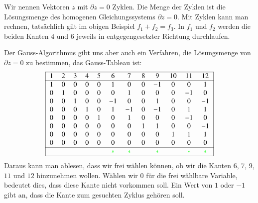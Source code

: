 Wir nennen Vektoren $z$ mit $\partial z=0$ Zyklen.
Die Menge der Zyklen ist die Lösungsmenge des homogenen
Gleichungssystems $\partial z=0$. Mit Zyklen kann man rechnen,
tatsächlich gilt im obigen Beispiel $f_1+f_2=f_3$. In $f_1$
und $f_2$ werden die beiden Kanten $4$ und $6$ jeweils in
entgegengesetzter Richtung durchlaufen.

Der Gauss-Algorithmus gibt uns aber auch ein Verfahren, die
Lösungsmenge von $\partial z=0$ zu bestimmen, das Gauss-Tableau
ist:
\[
\begin{tabular}{|>{$}c<{$}>{$}c<{$}>{$}c<{$}>{$}c<{$}>{$}c<{$}>{$}c<{$}>{$}c<{$}>{$}c<{$}>{$}c<{$}>{$}c<{$}>{$}c<{$}>{$}c<{$}|}
\hline
   1&  2&  3&  4&  5&  6&  7&  8&  9& 10& 11& 12\\
\hline
   1&  0&  0&  0&  0&  1&  0&  0& -1&  0&  0&  1\\
   0&  1&  0&  0&  0&  0&  1&  0&  0&  0& -1&  0\\
   0&  0&  1&  0&  0& -1&  0&  0&  1&  0&  0& -1\\
   0&  0&  0&  1&  0&  1& -1&  0& -1&  0&  1&  1\\
   0&  0&  0&  0&  1&  0&  1&  0&  0&  0& -1&  0\\
   0&  0&  0&  0&  0&  0&  0&  1&  1&  0&  0& -1\\
   0&  0&  0&  0&  0&  0&  0&  0&  0&  1&  1&  1\\
   0&  0&  0&  0&  0&  0&  0&  0&  0&  0&  0&  0\\
\hline
    &   &   &   &   &\color{green}  *&\color{green}  *&   &\color{green}  *&   &\color{green}  *&\color{green}  *\\
\hline
\end{tabular}
\]
Daraus kann man ablesen, dass wir frei wählen
können, ob wir die Kanten $6$, $7$, $9$, $11$ und $12$
hinzunehmen wollen.
Wählen wir $0$ für die frei wählbare Variable, bedeutet dies,
dass diese Kante nicht vorkommen soll.
Ein Wert von $1$ oder $-1$ gibt an, dass die Kante zum gesuchten Zyklus
gehören soll.

